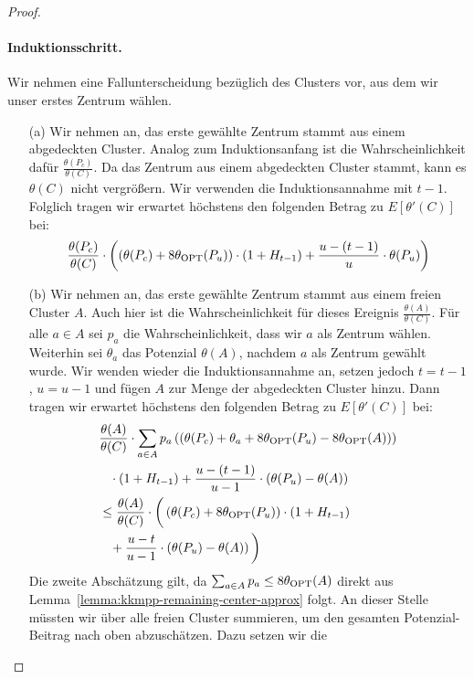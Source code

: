 \begin{proof}
	\paragraph{Induktionsschritt.} Wir nehmen eine Fallunterscheidung bezüglich des Clusters vor, aus dem wir unser erstes
	Zentrum wählen.
	\begin{enumerate}
		\item[(a)] 	Wir nehmen an, das erste gewählte Zentrum stammt aus einem abgedeckten Cluster. Analog zum Induktionsanfang
					ist die Wahrscheinlichkeit dafür $\frac{\theta(P_c)}{\theta(C)}$. Da das Zentrum aus einem abgedeckten
					Cluster stammt, kann es $\theta(C)$ nicht vergrößern. Wir verwenden die Induktionsannahme mit $t-1$.
					Folglich tragen wir erwartet höchstens den folgenden Betrag zu $E[\theta'(C)]$ bei:
					\[ \frac{\theta(P_c)}{\theta(C)} \cdot \left( \left( \theta(P_c) + 8 \theta_{\textrm{OPT}}(P_u) \right)
						\cdot (1 + H_{t-1}) + \frac{u - (t-1)}{u} \cdot \theta(P_u) \right) \]
		\item[(b)] 	Wir nehmen an, das erste gewählte Zentrum stammt aus einem freien Cluster $A$. Auch hier ist die
					Wahrscheinlichkeit für dieses Ereignis $\frac{\theta(A)}{\theta(C)}$. Für alle $a \in A$ sei
					$p_a$ die Wahrscheinlichkeit, dass wir $a$ als Zentrum wählen. Weiterhin sei $\theta_a$ das Potenzial
					$\theta(A)$, nachdem $a$ als Zentrum gewählt wurde. Wir wenden wieder die Induktionsannahme an, setzen
					jedoch $t = t-1$, $u = u-1$ und fügen $A$ zur Menge der abgedeckten Cluster hinzu. Dann tragen wir
					erwartet höchstens den folgenden Betrag zu $E[\theta'(C)]$ bei:
					\begin{align*}
						& \frac{\theta(A)}{\theta(C)} \cdot \sum_{a \in A} p_a \left(
							\left( \theta(P_c) + \theta_a + 8 \theta_{\textrm{OPT}}(P_u) - 8 \theta_{\textrm{OPT}}(A) \right)
							\right) \\
						& \; \; \; \cdot (1 + H_{t-1}) + \frac{u - (t-1)}{u-1} \cdot \left(
							\theta(P_u) - \theta(A) \right) \\
						&\leq \frac{\theta(A)}{\theta(C)} \cdot \bigg( \left( \theta(P_c) + 8 \theta_{\textrm{OPT}}(P_u) \right)
							\cdot (1 + H_{t-1}) \\
						& \; \; \; + \frac{u-t}{u-1} \cdot \left( \theta(P_u) - \theta(A) \right) \bigg)
					\end{align*}
					Die zweite Abschätzung gilt, da $\sum_{a \in A} p_a \leq 8 \theta_{\textrm{OPT}}(A)$ direkt aus
					Lemma~\ref{lemma:kkmpp-remaining-center-approx} folgt. An dieser Stelle müssten wir über alle freien
					Cluster summieren, um den gesamten Potenzial-Beitrag nach oben abzuschätzen. Dazu setzen wir die

\end{enumerate}
\end{proof}
